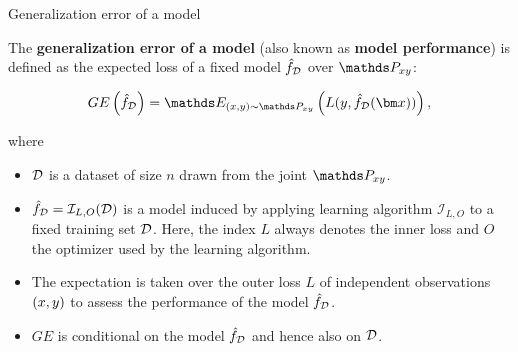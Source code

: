 






%
%
%
%

\begin{vbframe}{Generalization error of a model}

The \textbf{generalization error of a model} (also known as \textbf{model performance}) is defined as the expected loss of a fixed model $\hat{f}_{\mathcal{D}}$ over $\Pxy$:

$$
GE\left(\fhD\right) = \E_{\xy \sim \Pxy}\left( L(y, \fhD(\xv))\right),
$$

where

\begin{itemize}
\item $\mathcal{D}$ is a dataset of size $n$ drawn from the joint $\Pxy$.
\item $\hat{f}_{\mathcal{D}} = \mathcal{I}_{L, O}(\mathcal{D})$ is a model induced by applying learning algorithm $\mathcal{I}_{L, O}$ to a fixed training set $\mathcal{D}$. Here, the index $L$ always denotes the inner loss and $O$ the optimizer used by the learning algorithm.
\item The expectation is taken over the outer loss $L$ of independent observations $(x, y)$ to assess the performance of the model $\hat{f}_{\mathcal{D}}$.
\item $GE$ is conditional on the model $\hat{f}_{\mathcal{D}}$ and hence also on $\mathcal{D}$. %
\end{itemize}
\end{vbframe}


